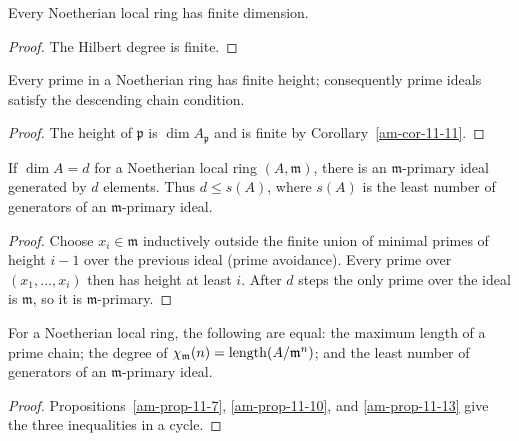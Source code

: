 \begin{corollary}
\label{am-cor-11-11}
\uses{}
Every Noetherian local ring has finite dimension.
\end{corollary}
\begin{proof}
The Hilbert degree is finite.
\end{proof}
\begin{corollary}
\label{am-cor-11-12}
\uses{}
Every prime in a Noetherian ring has finite height; consequently prime ideals
satisfy the descending chain condition.
\end{corollary}
\begin{proof}
The height of $\mathfrak{p}$ is $\dim A_\mathfrak{p}$ and is finite by Corollary~\ref{am-cor-11-11}.
\end{proof}
\begin{proposition}[Parameters]
\label{am-prop-11-13}
\uses{}
If $\dim A=d$ for a Noetherian local ring $(A,\mathfrak{m})$, there is an
$\mathfrak{m}$-primary ideal generated by $d$ elements.  Thus $d\le s(A)$, where $s(A)$
is the least number of generators of an $\mathfrak{m}$-primary ideal.
\end{proposition}
\begin{proof}
Choose $x_i\in\mathfrak{m}$ inductively outside the finite union of minimal primes of
height $i-1$ over the previous ideal (prime avoidance).  Every prime over
$(x_1,\ldots,x_i)$ then has height at least $i$.  After $d$ steps the only
prime over the ideal is $\mathfrak{m}$, so it is $\mathfrak{m}$-primary.
\end{proof}
\begin{theorem}
\label{am-thm-11-14}
\uses{}
For a Noetherian local ring, the following are equal: the maximum length of a
prime chain; the degree of $\chi_\mathfrak{m}(n)=\operatorname{length}(A/\mathfrak{m}^n)$; and the least number
of generators of an $\mathfrak{m}$-primary ideal.
\end{theorem}
\begin{proof}
Propositions~\ref{am-prop-11-7}, \ref{am-prop-11-10}, and
\ref{am-prop-11-13} give the three inequalities in a cycle.
\end{proof}
